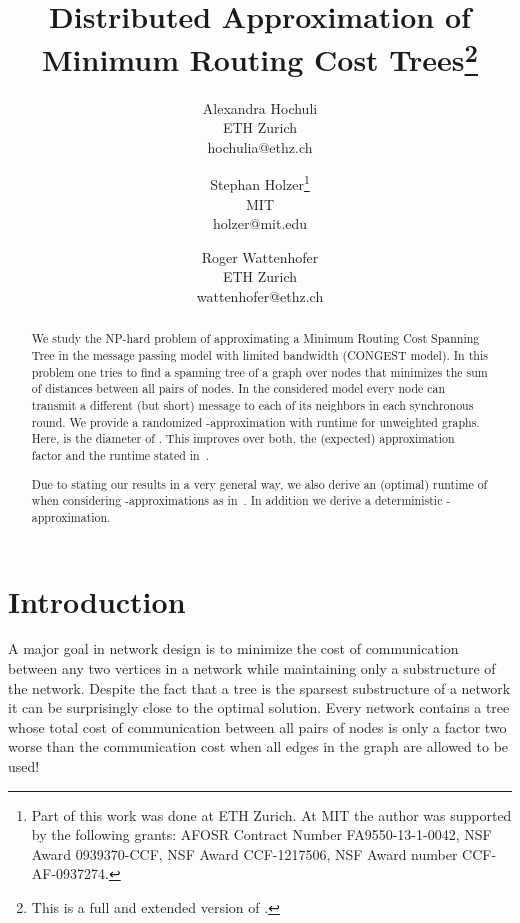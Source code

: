 \documentclass[11pt]{article}
\begin{document}
	
\title{
Distributed Approximation of Minimum Routing Cost Trees\thanks{This is a full and extended version of \cite{MRCT-SIROCCO}.} 
}


\author{
Alexandra Hochuli
\\
ETH Zurich
\\
hochulia@ethz.ch\and
Stephan Holzer\footnote{Part of this work was done at ETH Zurich. At MIT the author was supported by the following grants: AFOSR Contract Number FA9550-13-1-0042, NSF Award 0939370-CCF, NSF Award CCF-1217506, NSF Award number CCF-AF-0937274.}
\\
MIT
\\
holzer@mit.edu\and
Roger Wattenhofer
\\
ETH Zurich
\\
wattenhofer@ethz.ch}


\maketitle

\begin{abstract}
We study the NP-hard problem of approximating a Minimum Routing Cost Spanning Tree in the message passing model with limited bandwidth (CONGEST model). In this problem one tries to find a spanning tree of a graph  over  nodes that minimizes the sum of distances between all pairs of nodes. In the considered model every node can transmit a different (but short) message to each of its neighbors in each synchronous round. We provide a randomized -approximation with runtime  for unweighted graphs. Here,  is the diameter of . This improves over both, the (expected) approximation factor  and the runtime  stated in~\cite{khan2008efficient}. 

Due to stating our results in a very general way, we also derive an (optimal) runtime of  when considering -approximations as in~\cite{khan2008efficient}. In addition we derive a deterministic -approximation.


\end{abstract}

\section{Introduction}\label{sec:intro}
A major goal in network design is to minimize the cost of communication between any two
vertices in a network while maintaining only a substructure of the network. Despite the fact that a tree is the sparsest substructure of a network it can be surprisingly close to the optimal solution. Every network contains a tree whose total cost of communication between all pairs of nodes is only a factor two worse than the communication cost when all edges in the graph are allowed to be used!
\end{document}
